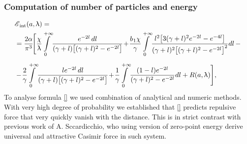\documentclass[10pt,t]{beamer}
\begin{document}
\begin{frame}
  \frametitle{Computation of number of particles and energy}

  \vspace{-2em}


  \begin{equation}
    \label{eq:Energia-Casimira-dla-rodziny-ETC-09}
    \begin{split}
      &\EInt( a, \lambda ) = \\
      &=
        \frac{ 2 \alpha }{ \pi^{ 3 } } \! \Bigg[ \frac{ \chi }{ \lambda } \!
        \int\limits_{ 0 }^{ +\infty } \!
        \frac{ e^{ -2 l } \, dl }{ ( \gamma + l )
        \big[ ( \gamma + l )^{ 2 } - e^{ -2 l } \big] } \! + \!
        \frac{ b_{ \HorSpaceOne 1 } \chi }{ \gamma } \!
        \int\limits_{ 0 }^{ +\infty } \!
        \frac{ l^{ 2 } \big[ 3 ( \gamma + l )^{ 2 } e^{ -2 l } -
        e^{ -4 l } \big] }
        { ( \gamma + l )^{ 2 }
        \big[ ( \gamma + l )^{ 2 } - e^{ -2 l } \big]^{ 2 } } dl
        \, - \\[0.5em]
      &- \! \frac{ 2 }{ \gamma } \! \int\limits_{ 0 }^{ +\infty } \!
        \frac{ l e^{ -2 l }\, dl }{ ( \gamma + l )
        \big[ ( \gamma + l )^{ 2 } - e^{ -2 l } \big] } \! + \!
        \frac{ 1 }{ \gamma } \!
        \int\limits_{ 0 }^{ +\infty } \! \frac{ ( 1 - l ) e^{ -2 l } }{
        ( \gamma + l )^{ 2 } - e^{ -2 l } } dl + R( a, \lambda ) \Bigg],
    \end{split}
  \end{equation}
  To analyse formula \eqref{} we used combination of analytical and numeric
  methods. With very high degree of probability we established that \eqref{}
  predicts repulsive force that very quickly vanish with the distance.
  This is in strict contrast with previous work of A. Sccardicchio, who
  using version of zero-point energy derive \alert{universal} and
  \alert{attractive} Casimir force in such system.



\end{frame}
\end{document}
